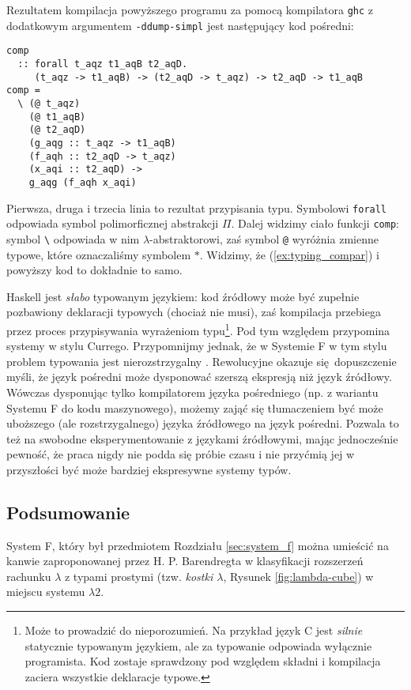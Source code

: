 Rezultatem kompilacja powyższego programu za pomocą kompilatora \texttt{ghc} z dodatkowym argumentem \texttt{-ddump-simpl} jest następujący kod pośredni:

\begin{verbatim}
comp
  :: forall t_aqz t1_aqB t2_aqD.
     (t_aqz -> t1_aqB) -> (t2_aqD -> t_aqz) -> t2_aqD -> t1_aqB
comp =
  \ (@ t_aqz)
    (@ t1_aqB)
    (@ t2_aqD)
    (g_aqg :: t_aqz -> t1_aqB)
    (f_aqh :: t2_aqD -> t_aqz)
    (x_aqi :: t2_aqD) ->
    g_aqg (f_aqh x_aqi)
\end{verbatim}

Pierwsza, druga i trzecia linia to rezultat przypisania typu. Symbolowi \texttt{forall} odpowiada symbol polimorficznej abstrakcji \(\Pi\). Dalej widzimy ciało funkcji \texttt{comp}: symbol \texttt{\textbackslash} odpowiada w nim \(\lambda\)-abstraktorowi, zaś symbol \texttt{@} wyróżnia zmienne typowe, które oznaczaliśmy symbolem \(\ast\). Widzimy, że (\ref{ex:typing_compar}) i powyższy kod to dokładnie to samo.

Haskell jest \emph{słabo} typowanym językiem: kod źródłowy może być zupełnie pozbawiony deklaracji typowych (chociaż nie musi), zaś kompilacja przebiega przez proces przypisywania wyrażeniom typu\footnote{Może to prowadzić do nieporozumień. Na przykład język C jest \emph{silnie} statycznie typowanym językiem, ale za typowanie odpowiada wyłącznie programista. Kod zostaje sprawdzony pod względem składni i kompilacja zaciera wszystkie deklaracje typowe.}. Pod tym względem przypomina systemy w stylu Currego. Przypomnijmy jednak, że w Systemie F w tym stylu problem typowania jest nierozstrzygalny \cite{Wells_98}. Rewolucyjne okazuje się dopuszczenie myśli, że język pośredni może dysponować szerszą ekspresją niż język źródłowy. Wówczas dysponując tylko kompilatorem języka pośredniego (np. z wariantu Systemu F do kodu maszynowego), możemy zająć się tłumaczeniem być może uboższego (ale rozstrzygalnego) języka źródłowego na język pośredni. Pozwala to też na swobodne eksperymentowanie z językami źródłowymi, mając jednocześnie pewność, że praca nigdy nie podda się próbie czasu i nie przyćmią jej w przyszłości być może bardziej ekspresywne systemy typów.


\subsection{Podsumowanie}
System F, który był przedmiotem Rozdziału \ref{sec:system_f} można umieścić na kanwie zaproponowanej przez H. P. Barendregta w \cite[Rozdział 5]{Barendregt_1992} klasyfikacji rozszerzeń rachunku \(\lambda\) z typami prostymi (tzw. \emph{kostki \(\lambda\)}, Rysunek \ref{fig:lambda-cube}) w miejscu systemu \(\lambda 2\). 


